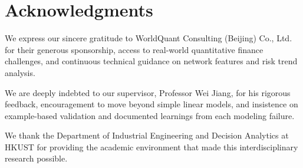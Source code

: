 \documentclass[11pt, a4paper]{article}
\begin{document}
\begin{abstract}
    Finally, the study extends the forecasting model into an academic portfolio backtest. Annual ST-GAT predictions are held fixed over their July-to-June forecast window, while portfolios are rebalanced monthly using next-month execution timing, transaction costs of 10 bps, slippage of 5 bps, and SPY as benchmark. Under the default dynamic taxonomy, the ST-GAT return-only long-short portfolio achieves 7.31\% annualized return, 8.34\% annualized volatility, a Sharpe ratio of 0.88, Sortino ratio of 1.52, maximum drawdown of -8.06\%, and beta of 0.30 against SPY. Its return-only top-minus-bottom spread is 16.26\% annualized, with a conventional $t$-test $p=0.080$ and HAC/Newey-West $p=0.034$ before Benjamini-Hochberg adjustment. The $\theta=0.40$ sensitivity variant improves forecast errors but does not uniformly improve portfolio ranking: its ST-GAT return-only spread is 9.33\% annualized, below its identity-baseline spread of 11.68\%. The defensible conclusion is therefore nuanced: textual risk topology can improve forecast and ranking diagnostics, but the portfolio alpha interpretation is sensitive to taxonomy evolution settings and short OOS windows.

    \vspace{0.5cm}
    \noindent \textbf{Keywords} -- Text classification; Large language models; SEC Item 1A; Risk taxonomy; Graph Neural Networks; ST-GAT; Portfolio backtesting; Volatility forecasting; Risk similarity; Semantic peer networks; Volatility contagion.
\end{abstract}

\section*{Acknowledgments}

We express our sincere gratitude to WorldQuant Consulting (Beijing) Co., Ltd. for their generous sponsorship, access to real-world quantitative finance challenges, and continuous technical guidance on network features and risk trend analysis.

We are deeply indebted to our supervisor, Professor Wei Jiang, for his rigorous feedback, encouragement to move beyond simple linear models, and insistence on example-based validation and documented learnings from each modeling failure.

We thank the Department of Industrial Engineering and Decision Analytics at HKUST for providing the academic environment that made this interdisciplinary research possible.
\end{document}
